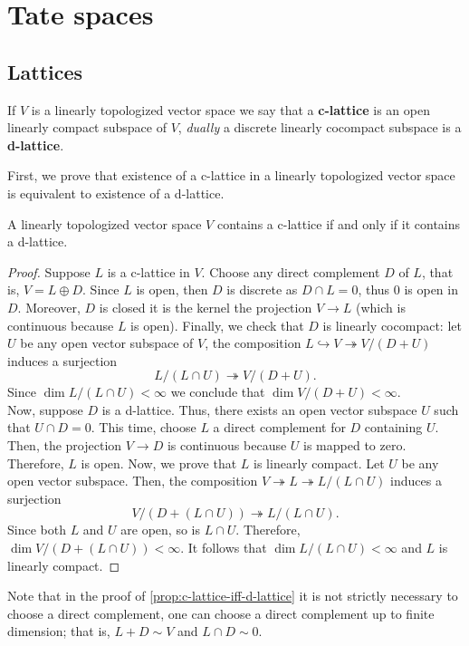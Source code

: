 \section{Tate spaces}
\subsection{Lattices}
\begin{definition}\label{def:c-lattice}
	If $V$ is a linearly topologized vector space we say that a \textbf{c-lattice} is an open linearly compact subspace of $V$, \textit{dually} a discrete linearly cocompact subspace is a \textbf{d-lattice}.
\end{definition}
First, we prove that existence of a c-lattice in a linearly topologized vector space is equivalent to existence of a d-lattice.
\begin{proposition}\label{prop:c-lattice-iff-d-lattice}
	A linearly topologized vector space $V$ contains a c-lattice if and only if it contains a d-lattice. 
\end{proposition}
\begin{proof}
	Suppose $L$ is a c-lattice in $V$. Choose any direct complement $D$ of $L$, that is, $V = L \oplus D$. Since $L$ is open, then $D$ is discrete as $D\cap L = 0$, thus ${0}$ is open in $D$. Moreover, $D$ is closed it is the kernel the projection $V \to L$ (which is continuous because $L$ is open). Finally, we check that $D$ is linearly cocompact: let $U$ be any open vector subspace of $V$, the composition $L \hookrightarrow V \twoheadrightarrow V/(D+U)$ induces a surjection 
	\[
		L/(L \cap U) \twoheadrightarrow V/(D+U).
	\]
	Since $\dim L / (L \cap U) < \infty$ we conclude that $\dim V/(D+U) < \infty$. \\
	Now, suppose $D$ is a d-lattice. Thus, there exists an open vector subspace $U$ such that $U \cap D = 0$. This time, choose $L$ a direct complement for $D$ containing $U$. Then, the projection $V \to D$ is continuous because $U$ is mapped to zero. Therefore, $L$ is open. Now, we prove that $L$ is linearly compact. Let $U$ be any open vector subspace. Then, the composition $V \twoheadrightarrow L \twoheadrightarrow L/(L \cap U)$ induces a surjection
	 \[
	 	V/(D + (L \cap U)) \twoheadrightarrow L/(L \cap U).
	 \]
	 Since both $L$ and $U$ are open, so is $L\cap U$. Therefore, $\dim V/(D + (L \cap U)) < \infty$. It follows that $\dim L/(L \cap U) < \infty$ and $L$ is linearly compact.  
\end{proof}
\begin{remark}\label{up-to-finite-dimension}
	Note that in the proof of \cref{prop:c-lattice-iff-d-lattice} it is not strictly necessary to choose a direct complement, one can choose a direct complement up to finite dimension; that is, $L + D \sim V$ and $L \cap D \sim 0$. 
\end{remark}
